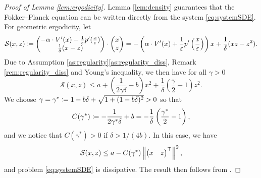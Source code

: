\documentclass[10pt]{article}
\begin{document}
\begin{appendices}
\begin{proof}[Proof of Lemma \ref{lem:ergodicity}] Lemma \ref{lem:density} guarantees that the Fokker--Planck equation can be written directly from the system \eqref{eq:systemSDE}. For geometric ergodicity, let 
	\begin{equation}
	\mathcal S(x,z) \coloneqq \begin{pmatrix} -\alpha \cdot V'(x) - \frac1{\varepsilon} p'(\frac{x}{\varepsilon}) \\ \frac1\delta (x - z) \end{pmatrix} \cdot \begin{pmatrix} x \\ z \end{pmatrix} =  -\left(\alpha \cdot V'(x) + \frac1{\varepsilon} p'\left(\frac{x}{\varepsilon}\right)\right)x + \frac1\delta(xz-z^2).
	\end{equation}
	Due to Assumption \ref{as:regularity}\ref{as:regularity_diss}, Remark \ref{rem:regularity_diss} and Young's inequality, we then have for all $\gamma > 0$
	\begin{equation}
	\mathcal S(x,z) \leq a + \left(\frac{1}{2\gamma\delta} - b\right)x^2 + \frac1\delta\left(\frac{\gamma}{2} - 1\right)z^2.
	\end{equation}
	We choose $\gamma = \gamma^* \coloneqq 1 - b\delta + \sqrt{1 + (1 - b\delta)^2} > 0$ so that
	\begin{equation}
	C(\gamma^*) \coloneqq -\frac{1}{2\gamma^*\delta} + b = -\frac1\delta\left(\frac{\gamma^*}{2} - 1\right),
	\end{equation}
	and we notice that $C(\gamma^*) > 0$ if $\delta > 1/(4b)$. In this case, we have
	\begin{equation}
	\mathcal S(x, z) \leq a - C(\gamma^*) \left\|\begin{pmatrix} x & z \end{pmatrix}^\top\right\|^2,
	\end{equation}
	and problem \eqref{eq:systemSDE} is dissipative. The result then follows from \cite[Theorem 4.4]{MSH02}.
\end{proof}


\end{appendices}
\end{document}
